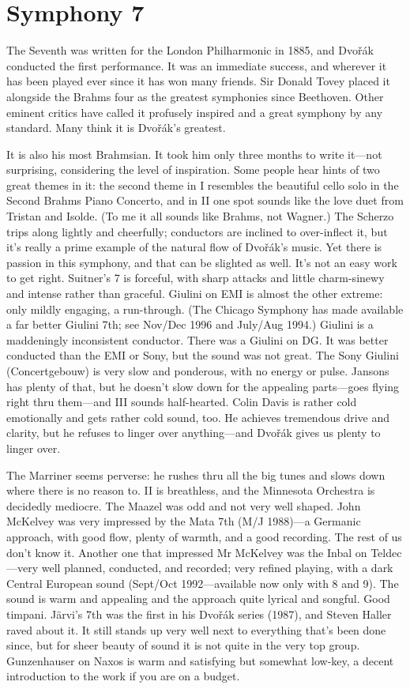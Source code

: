 \documentclass[12pt]{article}%
\begin{document}
\section{Symphony 7}

The Seventh was written for the London Philharmonic in 1885, and  Dvořák conducted the first performance. 
It was an immediate success, and wherever it has been played ever since it has won many friends. Sir Donald Tovey placed it alongside the Brahms four as the greatest symphonies since Beethoven.
Other eminent critics have called it profusely inspired and a great symphony by any standard. Many think it is Dvořák's greatest.

It is also his most Brahmsian. It took him only three months to write it---not surprising, considering the level of inspiration. Some people hear hints of two great themes in it: the second theme in I resembles the beautiful cello solo in the Second Brahms Piano Concerto, and in II one spot sounds like the love duet from Tristan and Isolde. (To me it all sounds like Brahms, not Wagner.) The Scherzo trips along lightly and cheerfully; conductors are inclined to over-inflect it, but it's really a prime example of the natural flow of Dvořák's music. Yet there is passion in this symphony, and that can be slighted as well. It's not an easy work to get right.
Suitner's 7 is forceful, with sharp attacks
and little charm-sinewy and intense rather than graceful. Giulini on EMI is almost the other extreme: only mildly engaging, a run-through. (The Chicago Symphony has made available a far better Giulini 7th; see Nov/Dec 1996 and July/Aug 1994.) Giulini is a maddeningly inconsistent conductor. There was a Giulini on DG. It was better conducted than the EMI or Sony, but the sound was not great. The Sony Giulini (Concertgebouw) is very slow and ponderous, with no energy or pulse. Jansons has plenty of that, but he doesn't slow down for the appealing parts---goes flying right thru them---and III sounds half-hearted. Colin Davis is rather cold emotionally and gets rather cold sound, too. He achieves tremendous drive and clarity, but he refuses to linger over anything---and Dvořák gives us plenty to linger over.

The Marriner seems perverse: he rushes thru all the big tunes and slows down where there is no reason to. II is breathless, and the Minnesota Orchestra is decidedly mediocre.
The Maazel was odd and not very well shaped.
John McKelvey was very impressed by the
Mata 7th (M/J 1988)---a Germanic approach,
with good flow, plenty of warmth, and a good recording. The rest of us don't know it.
Another one that impressed Mr McKelvey was the Inbal on Teldec---very well planned,
conducted, and recorded; very refined playing, with a dark Central European
sound (Sept/Oct 1992---available now only with 8 and 9). The sound is warm and 
appealing and the approach quite lyrical and songful. Good timpani.
Järvi's 7th was the first in his Dvořák series (1987), and Steven Haller raved about it.
It still stands up very well next to everything that's been 
done since, but for sheer beauty of sound it is not quite in the very top group.
Gunzenhauser on Naxos is warm and satisfying but somewhat low-key, a decent introduction
to the work if you are on a budget.
\end{document}
